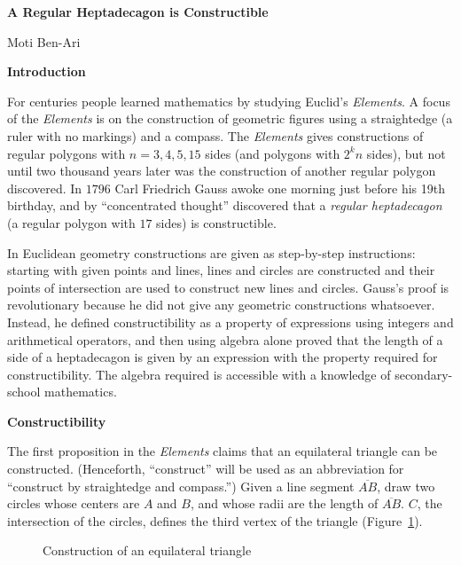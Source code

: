 \documentclass[a4paper,11pt]{article}
\newcommand*{\vertex}[1]
  {\fill[shift only] (#1) circle (1.5pt)}
\begin{document}
\begin{center}
\bfseries\Large
A Regular Heptadecagon is Constructible

\medskip

Moti Ben-Ari
\end{center}

\textbf{Introduction}

For centuries people learned mathematics by studying Euclid's \textit{Elements}. A focus of the \textit{Elements} is on the construction of geometric figures using a straightedge (a ruler with no markings) and a compass. The \textit{Elements} gives constructions of regular polygons with $n=3,4,5,15$ sides (and polygons with $2^kn$ sides), but not until two thousand years later was the construction of another regular polygon discovered. In $1796$ Carl Friedrich Gauss awoke one morning just before his 19th birthday, and by ``concentrated thought'' discovered that a \emph{regular heptadecagon} (a regular polygon with $17$ sides) is constructible.

In Euclidean geometry constructions are given as step-by-step instructions: starting with given points and lines, lines and circles are constructed and their points of intersection are used to construct new lines and circles. Gauss's proof is revolutionary because he did not give any geometric constructions whatsoever. Instead, he defined constructibility as a property of expressions using integers and arithmetical operators, and then using algebra alone proved that the length of a side of a heptadecagon is given by an expression with the property required for constructibility. The algebra required is accessible with a knowledge of secondary-school mathematics.

\textbf{Constructibility}

The first proposition in the \textit{Elements} claims that an equilateral triangle can be constructed. (Henceforth, ``construct'' will be used as an abbreviation for ``construct by straightedge and compass.'') Given a line segment $\overline{AB}$, draw two circles whose centers are $A$ and $B$, and whose radii are the length of $\overline{AB}$. $C$, the intersection of the circles, defines the third vertex of the triangle (Figure~\ref{fig.equilateral}).
\begin{figure}[hbt]
\begin{center}
\caption{Construction of an equilateral triangle}\label{fig.equilateral}
\end{center}
\end{figure}
\end{document}
